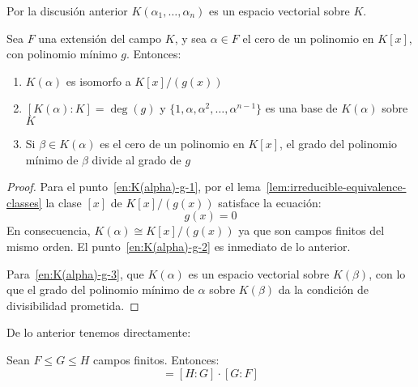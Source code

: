   Por la discusión anterior \(K(\alpha_1, \dotsc, \alpha_n)\)
  es un espacio vectorial sobre \(K\).%
  \begin{theorem}
    \label{theo:extension-isomorphic-minimal-polynomial}
    Sea \(F\) una extensión del campo \(K\),
    y sea \(\alpha \in F\) el cero de un polinomio en \(K[x]\),
    con polinomio mínimo \(g\).%
    Entonces:
    \begin{enumerate}[label = (\roman*), ref = (\roman*)]
    \item
      \label{en:K(alpha)-g-1}
      \(K(\alpha)\) es isomorfo a \(K[x] / (g(x))\)
    \item
      \label{en:K(alpha)-g-2}
      \([K(\alpha) : K] = \deg(g)\)
      y \(\{1, \alpha, \alpha^2, \dotsc, \alpha^{n - 1}\}\)
      es una base de \(K(\alpha)\) sobre \(K\)
    \item
      \label{en:K(alpha)-g-3}
      Si \(\beta \in K(\alpha)\)
      es el cero de un polinomio en \(K[x]\),
      el grado del polinomio mínimo de \(\beta\)
      divide al grado de \(g\)
    \end{enumerate}
  \end{theorem}
  \begin{proof}
    Para el punto~\ref{en:K(alpha)-g-1},
    por el lema~\ref{lem:irreducible-equivalence-classes}
    la clase \([x]\) de \(K[x] / (g(x))\)
    satisface la ecuación:
    \begin{equation*}
      g(x) = 0
    \end{equation*}
    En consecuencia,
    \(K(\alpha) \cong K[x] / (g(x))\)
    ya que son campos finitos del mismo orden.
    El punto~\ref{en:K(alpha)-g-2} es inmediato de lo anterior.

    Para~\ref{en:K(alpha)-g-3},
    que \(K(\alpha)\) es un espacio vectorial sobre \(K(\beta)\),
    con lo que el grado
    del polinomio mínimo de \(\alpha\) sobre \(K(\beta)\)
    da la condición de divisibilidad prometida.
  \end{proof}
  De lo anterior tenemos directamente:
  \begin{corollary}
    \label{cor:[H:F]=[H:G][G:F]}
    Sean \(F \le G \le H\) campos finitos.
    Entonces:
    \begin{equation*}
      [H : F]
	= [H : G] \cdot [G : F]
    \end{equation*}
  \end{corollary}

